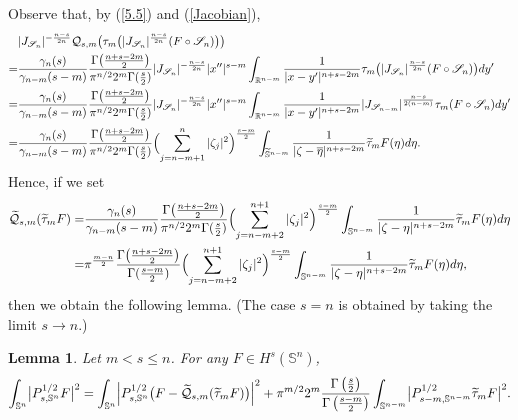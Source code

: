 \documentclass[12pt,reqno]{amsart}%
\theoremstyle{plain}
\newtheorem{lemma}{Lemma}[section]
\numberwithin{equation}{section}
\begin{document}
Observe that, by (\ref{5.5})  and (\ref{Jacobian}),
\begin{align*}
& |J_{\mathscr{S}_{n}}|^{-\frac{n-s}{2n}}
\mathcal{Q}_{s,m}\bigl(\tau_{m}\bigl( |J_{\mathscr{S}_{n}}|^{\frac{n-s}{2n}} (F \circ \mathscr{S}_{n}) \bigr)\bigr)\\
=& \frac{\gamma_{n}(s)}{\gamma_{n-m}(s-m)}
\frac{\Gamma\bigl(\frac{n+s-2m}{2}\bigr)}{\pi^{n/2}2^{m}\Gamma(\frac{s}{2})}
|J_{\mathscr{S}_{n}}|^{-\frac{n-s}{2n}}
|x''|^{s-m}
\int_{\mathbb{R}^{n-m}}\frac{1}{|x-y'|^{n+s-2m}}
\tau_{m}\bigl(|J_{\mathscr{S}_{n}}|^{\frac{n-s}{2n}} (F \circ \mathscr{S}_{n})\bigr)dy'\\
=& \frac{\gamma_{n}(s)}{\gamma_{n-m}(s-m)}
\frac{\Gamma\bigl(\frac{n+s-2m}{2}\bigr)}{\pi^{n/2}2^{m}\Gamma(\frac{s}{2})}
|J_{\mathscr{S}_{n}}|^{-\frac{n-s}{2n}}
|x''|^{s-m}
\int_{\mathbb{R}^{n-m}}\frac{1}{|x-y'|^{n+s-2m}}
|J_{\mathscr{S}_{n-m}}|^{\frac{n-s}{2(n-m)}} \tau_{m}(F \circ \mathscr{S}_{n})dy'\\[2pt]
=& \frac{\gamma_{n}(s)}{\gamma_{n-m}(s-m)}
\frac{\Gamma\bigl(\frac{n+s-2m}{2}\bigr)}{\pi^{n/2}2^{m}\Gamma(\frac{s}{2})}
\Bigl(\sum_{j=n-m+1}^{n}|\zeta_{j}|^{2}\Bigr)^{\frac{s-m}{2}}
\int_{\widetilde{\mathbb{S}}^{n-m}} \frac{1}{|\zeta-\overline{\eta}|^{n+s-2m}}
\widetilde{\tau}_{m}F(\eta)d\eta .
\end{align*}
Hence, if we set
\begin{align*}
\widetilde{\mathcal{Q}}_{s,m}(\widetilde{\tau}_{m}F)
=& \frac{\gamma_{n}(s)}{\gamma_{n-m}(s-m)}
\frac{\Gamma\bigl(\frac{n+s-2m}{2}\bigr)}{\pi^{n/2}2^{m}\Gamma(\frac{s}{2})}
\Bigl(\sum_{j=n-m+2}^{n+1}|\zeta_{j}|^{2}\Bigr)^{\frac{s-m}{2}}
\int_{\mathbb{S}^{n-m}} \frac{1}{|\zeta-\eta|^{n+s-2m}}
\widetilde{\tau}_{m}F(\eta)d\eta\\
=&\pi^{\frac{m-n}{2}}\frac{\Gamma\bigl(\frac{n+s-2m}{2}\bigr)}{\Gamma(\frac{s-m}{2})}\Bigl(\sum_{j=n-m+2}^{n+1}|\zeta_{j}|^{2}\Bigr)^{\frac{s-m}{2}}
\int_{\mathbb{S}^{n-m}} \frac{1}{|\zeta-\eta|^{n+s-2m}}
\widetilde{\tau}_{m}F(\eta)d\eta,
\end{align*}
then
we obtain the following lemma. (The case \(s=n\) is obtained by taking the limit \(s\to n\).)

\begin{lemma}\label{lm5.3}
Let \(m< s \leq n\).
For any \(F \in H^{s}(\mathbb{S}^{n})\),
\[
\int_{\mathbb{S}^{n}}\bigl|P_{s,\mathbb{S}^{n}}^{1/2}F\bigr|^{2}
= \int_{\mathbb{S}^{n}}\Bigl|P_{s,\mathbb{S}^{n}}^{1/2}\bigl(F-
\widetilde{\mathcal{Q}}_{s,m}(\widetilde{\tau}_{m}F)\bigr)\Bigr|^{2}
+ \pi^{m/2}  2^{m}  \frac{\Gamma\left(\frac{s}{2}\right)}{\Gamma\left(\frac{s-m}{2}\right)}
\int_{\mathbb{S}^{n-m}}\bigl|P_{s-m,\mathbb{S}^{n-m}}^{1/2}
\widetilde{\tau}_{m}F\bigr|^{2}.
\]
\end{lemma}
\end{document}
